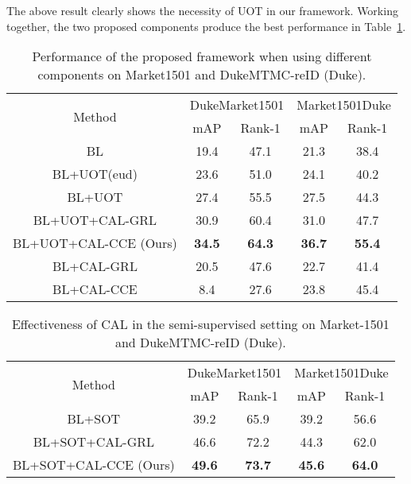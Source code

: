 \documentclass[10pt,twocolumn,letterpaper]{article}
\begin{document}
The above result clearly shows the necessity of UOT in our framework. Working together, the two proposed components produce the best performance in Table~\ref{tab02}.   
 
 
 
\begin{table}[htbp]
 \centering
 \caption{Performance of the proposed framework when using different components on Market1501 and DukeMTMC-reID (Duke).}
 \begin{adjustbox}{width=0.48\textwidth}
   \begin{tabular}{|c|cc|cc|}
   \toprule
   \multirow{2}[1]{*}{Method} & \multicolumn{2}{c|}{DukeMarket1501} & \multicolumn{2}{c|}{Market1501Duke} \\
\cmidrule{2-5}         & mAP  & Rank-1 & mAP  & Rank-1 \\
   \midrule
   BL & 19.4 & 47.1 & 21.3 & 38.4 \\
\midrule
   BL+UOT(eud) & 23.6 & 51.0 & 24.1 & 40.2 \\
   BL+UOT & 27.4 & 55.5 & 27.5 & 44.3 \\
   \midrule
   BL+UOT+CAL-GRL & 30.9 & 60.4 & 31.0 & 47.7 \\
   BL+UOT+CAL-CCE (Ours) & \textcolor[rgb]{ 1, 0, 0}{\textbf{34.5}} & \textcolor[rgb]{ 1, 0, 0}{\textbf{64.3}} & \textcolor[rgb]{ 1, 0, 0}{\textbf{36.7}} & \textcolor[rgb]{ 1, 0, 0}{\textbf{55.4}} \\
   \midrule
   \midrule
   BL+CAL-GRL & 20.5 & 47.6 & 22.7 & 41.4 \\
   BL+CAL-CCE & 8.4 & 27.6 & 23.8 & 45.4 \\
   \bottomrule
   \end{tabular}\end{adjustbox}
      \label{tab02}\vspace*{-15pt}
\end{table}

\begin{table}[htbp]
 \centering
 \caption{Effectiveness of CAL in the semi-supervised setting on Market-1501 and DukeMTMC-reID (Duke).}
 \begin{adjustbox}{width=0.48\textwidth}
   \begin{tabular}{|c|cc|cc|}
   \toprule
   \multirow{2}[2]{*}{Method} & \multicolumn{2}{c|}{DukeMarket1501} & \multicolumn{2}{c|}{Market1501Duke} \\
\cmidrule{2-5}         & mAP  & Rank-1 & mAP  & Rank-1 \\
   \midrule
    BL+SOT & 39.2 & 65.9 & 39.2 & 56.6 \\
    \midrule
   BL+SOT+CAL-GRL & 46.6 & 72.2 & 44.3 & 62.0 \\
   BL+SOT+CAL-CCE (Ours)& \textcolor[rgb]{ 1, 0, 0}{\textbf{49.6}} & \textcolor[rgb]{ 1, 0, 0}{\textbf{73.7}} & \textcolor[rgb]{ 1, 0, 0}{\textbf{45.6}} & \textcolor[rgb]{ 1, 0, 0}{\textbf{64.0}} \\
   \bottomrule
   \end{tabular}\end{adjustbox}
 \label{tab05}\vspace*{-10pt}
\end{table}
\end{document}
